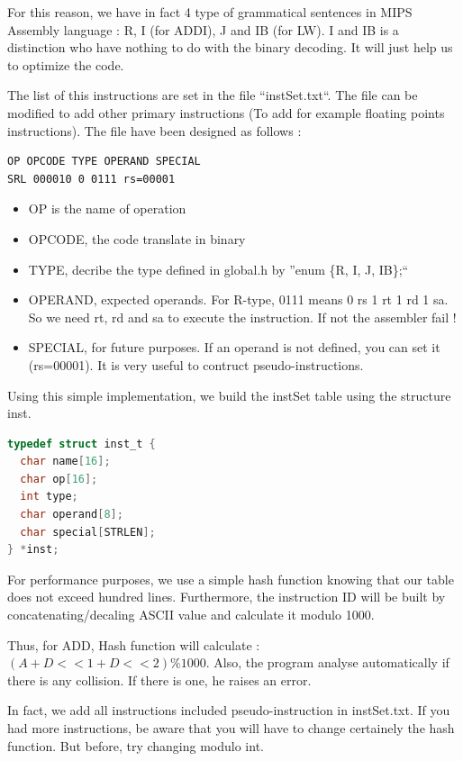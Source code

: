 \documentclass[twoside,twocolumn]{article}
\begin{document}
For this reason, we have in fact 4 type of grammatical sentences in MIPS Assembly language : R, I (for ADDI), J and IB (for LW). I and IB is a distinction who have nothing to do with the binary decoding. It will just help us to optimize the code.

The list of this instructions are set in the file ``instSet.txt``. The file can be modified to add other primary instructions (To add for example floating points instructions). The file have been designed as follows :

\begin{lstlisting}
OP OPCODE TYPE OPERAND SPECIAL
SRL 000010 0 0111 rs=00001
\end{lstlisting}

\begin{itemize}
 \item OP is the name of operation
 \item OPCODE, the code translate in binary
 \item TYPE, decribe the type defined in global.h by ''enum \{R, I, J, IB\};``
 \item OPERAND, expected operands. For R-type, 0111 means 0 rs 1 rt 1 rd 1 sa. So we need rt, rd and sa to execute the instruction. If not the assembler fail !
 \item SPECIAL, for future purposes. If an operand is not defined, you can set it (rs=00001). It is very useful to contruct pseudo-instructions.
\end{itemize}

Using this simple implementation, we build the instSet table using the structure inst.

\begin{lstlisting}[language=C]
typedef struct inst_t {
  char name[16];
  char op[16];
  int type;
  char operand[8];
  char special[STRLEN];
} *inst;
\end{lstlisting}

For performance purposes, we use a simple hash function knowing that our table does not exceed hundred lines. Furthermore, the instruction ID will be built by concatenating/decaling ASCII value and calculate it modulo 1000.

Thus, for ADD, Hash function will calculate : $( A + D << 1 + D << 2 ) \% 1000$. Also, the program analyse automatically if there is any collision. If there is one, he raises an error.

In fact, we add all instructions included pseudo-instruction in instSet.txt. If you had more instructions, be aware that you will have to change certainely the hash function. But before, try changing modulo int.
\end{document}

